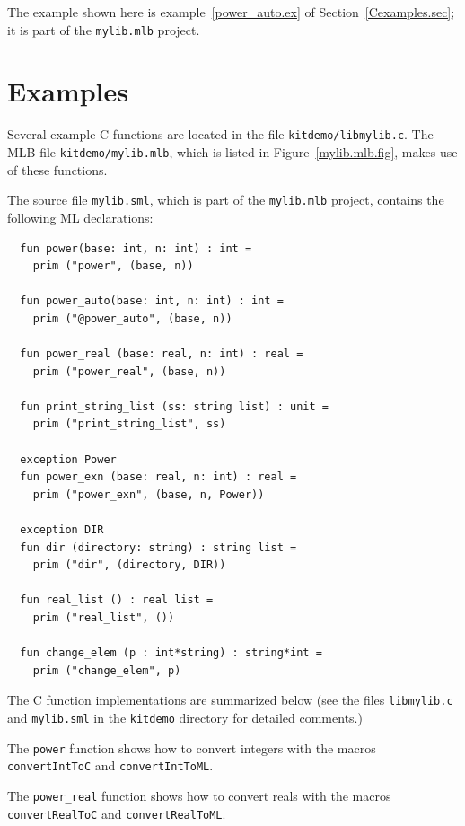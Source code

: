 \documentclass[12pt]{book}
\begin{document}
The example shown here is example~\ref{power_auto.ex} of
Section~\ref{Cexamples.sec}; it is part of the \verb|mylib.mlb|
project.

\section{Examples\label{Cexamples.sec}}
%
%
%
Several example C functions are located in the file
\verb|kitdemo/libmylib.c|. The MLB-file \verb|kitdemo/mylib.mlb|, which
is listed in Figure~\ref{mylib.mlb.fig}, makes use of these functions.

The source file \verb|mylib.sml|, which is part of the
\verb|mylib.mlb| project, contains the following ML declarations:
\begin{verbatim}
  fun power(base: int, n: int) : int =
    prim ("power", (base, n))

  fun power_auto(base: int, n: int) : int =
    prim ("@power_auto", (base, n))

  fun power_real (base: real, n: int) : real =
    prim ("power_real", (base, n))

  fun print_string_list (ss: string list) : unit =
    prim ("print_string_list", ss)

  exception Power
  fun power_exn (base: real, n: int) : real =
    prim ("power_exn", (base, n, Power))

  exception DIR
  fun dir (directory: string) : string list =
    prim ("dir", (directory, DIR))

  fun real_list () : real list =
    prim ("real_list", ())

  fun change_elem (p : int*string) : string*int =
    prim ("change_elem", p)
\end{verbatim}

The C function implementations are summarized below (see the files
\verb|libmylib.c| and \verb|mylib.sml| in the {\tt kitdemo} directory
for detailed comments.)

\begin{example}\label{power.ex}
  The \texttt{power} function shows how to convert
  integers with the macros \texttt{convertIntToC} and
  \texttt{convertIntToML}.
\end{example}

\begin{example}\label{power_real.ex}
  The \texttt{power\_real} function shows how
  to convert reals with the macros \texttt{convertRealToC} and
  \texttt{convertRealToML}.
\end{example}
\end{document}

